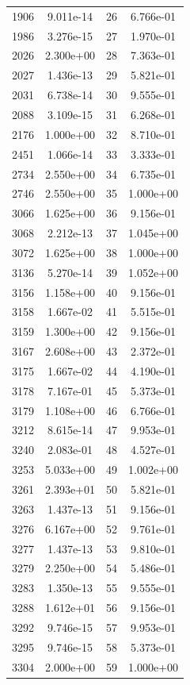 \documentclass[12pt]{article}
\begin{document}
\begin{longtable}{@{}cccc@{}}
1906 & 9.011e-14 & 26 & 6.766e-01 \\
1986 & 3.276e-15 & 27 & 1.970e-01 \\
2026 & 2.300e+00 & 28 & 7.363e-01 \\
2027 & 1.436e-13 & 29 & 5.821e-01 \\
2031 & 6.738e-14 & 30 & 9.555e-01 \\
2088 & 3.109e-15 & 31 & 6.268e-01 \\
2176 & 1.000e+00 & 32 & 8.710e-01 \\
2451 & 1.066e-14 & 33 & 3.333e-01 \\
2734 & 2.550e+00 & 34 & 6.735e-01 \\
2746 & 2.550e+00 & 35 & 1.000e+00 \\
3066 & 1.625e+00 & 36 & 9.156e-01 \\
3068 & 2.212e-13 & 37 & 1.045e+00 \\
3072 & 1.625e+00 & 38 & 1.000e+00 \\
3136 & 5.270e-14 & 39 & 1.052e+00 \\
3156 & 1.158e+00 & 40 & 9.156e-01 \\
3158 & 1.667e-02 & 41 & 5.515e-01 \\
3159 & 1.300e+00 & 42 & 9.156e-01 \\
3167 & 2.608e+00 & 43 & 2.372e-01 \\
3175 & 1.667e-02 & 44 & 4.190e-01 \\
3178 & 7.167e-01 & 45 & 5.373e-01 \\
3179 & 1.108e+00 & 46 & 6.766e-01 \\
3212 & 8.615e-14 & 47 & 9.953e-01 \\
3240 & 2.083e-01 & 48 & 4.527e-01 \\
3253 & 5.033e+00 & 49 & 1.002e+00 \\
3261 & 2.393e+01 & 50 & 5.821e-01 \\
3263 & 1.437e-13 & 51 & 9.156e-01 \\
3276 & 6.167e+00 & 52 & 9.761e-01 \\
3277 & 1.437e-13 & 53 & 9.810e-01 \\
3279 & 2.250e+00 & 54 & 5.486e-01 \\
3283 & 1.350e-13 & 55 & 9.555e-01 \\
3288 & 1.612e+01 & 56 & 9.156e-01 \\
3292 & 9.746e-15 & 57 & 9.953e-01 \\
3295 & 9.746e-15 & 58 & 5.373e-01 \\
3304 & 2.000e+00 & 59 & 1.000e+00 \\

\end{longtable}
\end{document}
